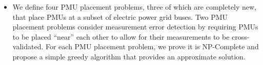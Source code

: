 \begin{itemize}



	\item We define four PMU placement problems, three of which are completely new, that place PMUs at a subset of electric power grid buses. 
		Two PMU placement problems consider measurement error detection by requiring PMUs to be placed ``near'' each other to allow for their measurements to be cross-validated. 
		For each PMU placement problem, we prove it is NP-Complete and propose a simple greedy algorithm that provides an approximate solution.

	

\end{itemize}
